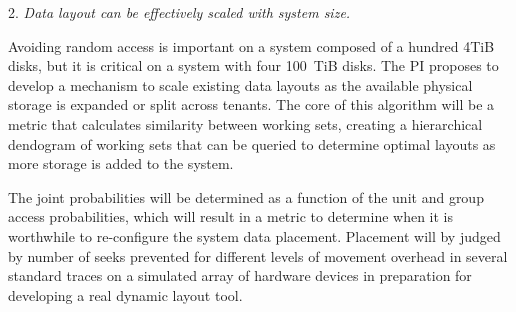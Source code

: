 \begin{myitemize}
%



\item[2.]
\emph{Data layout can be effectively scaled with system size.}%


Avoiding random access is important on a system composed of a hundred 4TiB disks, but it is
critical on a system with four 100~TiB disks.  
The PI proposes to develop a mechanism to scale existing data layouts as the
available physical storage is expanded or split across tenants.  The core of
this algorithm will be a metric that calculates similarity between working sets,
creating a hierarchical dendogram of working sets that can be queried to
determine optimal layouts as more storage is added to the system. 

The joint
probabilities will be determined as a function of the unit and group access
probabilities, which will result in a metric to determine when it is worthwhile
to re-configure the system data placement.
Placement will by judged by number of seeks prevented for different levels of
movement overhead in several standard traces on a simulated array of hardware
devices in preparation for developing a real dynamic layout tool.





\end{myitemize}
